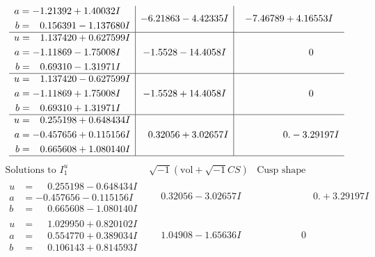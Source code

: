 \documentclass[1p]{elsarticle_modified}
\theoremstyle{definition}
\newcommand{\I}{\sqrt{-1}}
\begin{document}
$$\begin{array}{c|c|c}
\begin{aligned}
a &= -1.21392 + 1.40032 I \\
b &= \phantom{-}0.156391 - 1.137680 I\end{aligned}
 & -6.21863 - 4.42335 I & -7.46789 + 4.16553 I \\ \hline\begin{aligned}
u &= \phantom{-}1.137420 + 0.627599 I \\
a &= -1.11869 - 1.75008 I \\
b &= \phantom{-}0.69310 - 1.31971 I\end{aligned}
 & -1.5528 - 14.4058 I & \phantom{-0.000000 } 0 \\ \hline\begin{aligned}
u &= \phantom{-}1.137420 - 0.627599 I \\
a &= -1.11869 + 1.75008 I \\
b &= \phantom{-}0.69310 + 1.31971 I\end{aligned}
 & -1.5528 + 14.4058 I & \phantom{-0.000000 } 0 \\ \hline\begin{aligned}
u &= \phantom{-}0.255198 + 0.648434 I \\
a &= -0.457656 + 0.115156 I \\
b &= \phantom{-}0.665608 + 1.080140 I\end{aligned}
 & \phantom{-}0.32056 + 3.02657 I & \phantom{-0.000000 } 0. - 3.29197 I\\
 \hline 
 \end{array}$$\newpage$$\begin{array}{c|c|c}  
\text{Solutions to }I^u_{1}& \I (\text{vol} + \sqrt{-1}CS) & \text{Cusp shape}\\
 \hline 
\begin{aligned}
u &= \phantom{-}0.255198 - 0.648434 I \\
a &= -0.457656 - 0.115156 I \\
b &= \phantom{-}0.665608 - 1.080140 I\end{aligned}
 & \phantom{-}0.32056 - 3.02657 I & \phantom{-0.000000 -}0. + 3.29197 I \\ \hline\begin{aligned}
u &= \phantom{-}1.029950 + 0.820102 I \\
a &= \phantom{-}0.554770 + 0.389034 I \\
b &= \phantom{-}0.106143 + 0.814593 I\end{aligned}
 & \phantom{-}1.04908 - 1.65636 I & \phantom{-0.000000 } 0 \\ \hline\begin{aligned}

\end{aligned}
\end{array}$$
\end{document}
